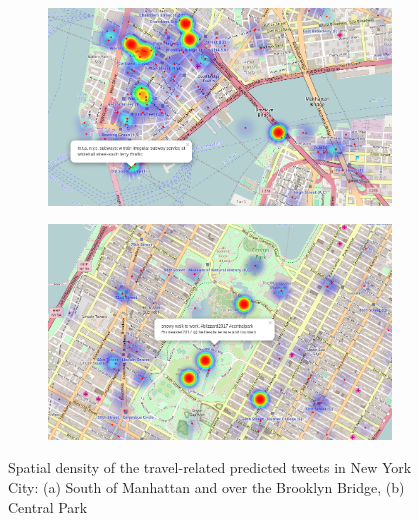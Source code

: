 \begin{figure}[htbp]
	\centering
	\begin{subfigure}[htbp]{0.8\textwidth}
		\centering
		\includegraphics[width=0.9\columnwidth]{figures/nyc_map.png}
		\caption{}
		\label{fig:brooklyn}
	\end{subfigure}
	
	\medskip
	
	\centering
	\begin{subfigure}[htbp]{0.8\textwidth}
		\centering
		\includegraphics[width=0.9\columnwidth]{figures/nyc_map2.png}
		\caption{}
		\label{fig:central_park}
	\end{subfigure}
	
	\caption[Spatial density of the predicted tweets]{Spatial density of the travel-related predicted tweets in New York City: (a) South of Manhattan and over the Brooklyn Bridge, (b) Central Park}
	\label{fig:nyc__geographical_distribution}
\end{figure}

